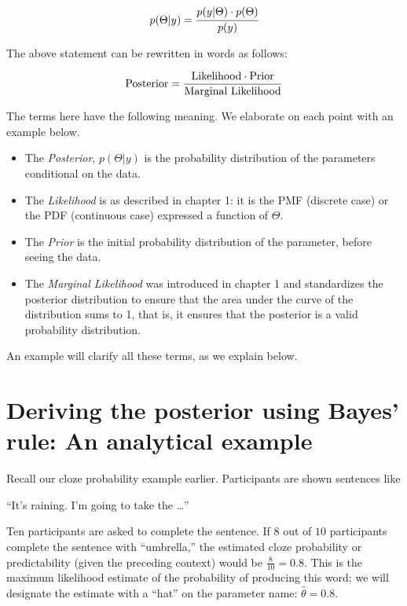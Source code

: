 \documentclass[12pt,]{krantz}
\theoremstyle{definition}
\theoremstyle{definition}
\theoremstyle{definition}
\theoremstyle{remark}
\begin{document}
\begin{equation}
p(\Theta|y) = \cfrac{ p(y|\Theta) \cdot p(\Theta) }{p(y)}
\label{eq:bayes}
\end{equation}

The above statement can be rewritten in words as follows:

\begin{equation}
\hbox{Posterior} = \frac{\hbox{Likelihood} \cdot \hbox{Prior}}{\hbox{Marginal Likelihood}}
\end{equation}

The terms here have the following meaning. We elaborate on each point with an example below.

\begin{itemize}
\item
  The \emph{Posterior}, \(p(\Theta|y)\) is the probability distribution of the parameters conditional on the data.
\item
  The \emph{Likelihood} is as described in chapter 1: it is the PMF (discrete case) or the PDF (continuous case) expressed a function of \(\Theta\).
\item
  The \emph{Prior} is the initial probability distribution of the parameter, before seeing the data.
\item
  The \emph{Marginal Likelihood} was introduced in chapter 1 and standardizes the posterior distribution to ensure that the area under the curve of the distribution sums to 1, that is, it ensures that the posterior is a valid probability distribution.
\end{itemize}

An example will clarify all these terms, as we explain below.

\hypertarget{sec:analytical}{%
\section{Deriving the posterior using Bayes' rule: An analytical example}\label{sec:analytical}}

Recall our cloze probability example earlier. Participants are shown sentences like

``It's raining. I'm going to take the \ldots{}''

Ten participants are asked to complete the sentence.
If \(8\) out of \(10\) participants complete the sentence with ``umbrella,'' the estimated cloze probability or predictability (given the preceding context) would be \(\frac{8}{10}=0.8\). This is the maximum likelihood estimate of the probability of producing this word; we will designate the estimate with a ``hat'' on the parameter name: \(\hat \theta=0.8\).
\end{document}
